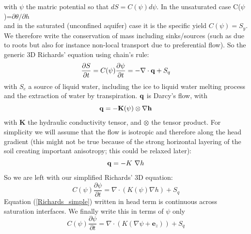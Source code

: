 \documentclass{report}
\begin{document}
with $\psi$ the matric potential so that $dS = C(\psi)d\psi$. In the unsaturated case C($\psi$)=$\partial \theta /\partial h$ \\ and in the saturated (unconfined aquifer) case it is the specific yield $C(\psi)=S_y$.
We therefore write the conservation of mass including sinks/sources (such as due to roots but also for instance non-local transport due to preferential flow). 
So the generic 3D Richards' equation using chain's rule:
\begin{equation}
     \frac{\partial S}{\partial t} = C(\psi)\frac{\partial \psi}{\partial t} = -\nabla \cdot {\bf{q}} + S_q
\label{Richards}
\end{equation}
with $S_e$ a source of liquid water, including the ice to liquid water melting process and the extraction of water by transpiration.
$\bf{q}$ is Darcy's flow, with 
\begin{equation}
     \bf{q} = - \mathbf{K}(\psi) \otimes \nabla h
\end{equation} with $ \mathbf{K}$ the hydraulic conductivity tensor, and $\otimes$ the tensor product.
For simplicity we will assume that the flow is isotropic and therefore along the head gradient (this might not be true because of the strong horizontal layering of the soil creating important anisotropy; this could be relaxed later):
\begin{equation}
     {\bf{q}} = - K \ \nabla h
\end{equation}
So we are left with our simplified Richards' 3D equation:
\begin{equation}
     C(\psi)\frac{\partial \psi}{\partial t}  = \nabla \cdot \left( {K(\psi) \nabla h} \right) + S_q
\label{Richards_simple}
\end{equation}
Equation (\ref{Richards_simple}) written in head term is continuous across saturation interfaces.
We finally write this in terms of $\psi$ only
\begin{equation}
     C(\psi)\frac{\partial \psi}{\partial t}  = \nabla \cdot \left( K \left( \nabla \psi + {\mathbf e_z} \right) \right) + S_q
\label{Richards_simple_bis}
\end{equation}
\end{document}
